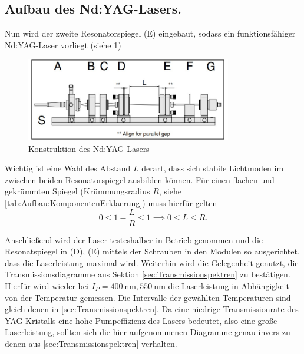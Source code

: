 \documentclass[../main.tex]{subfiles}
\begin{document}
    \subsection{Aufbau des Nd:YAG-Lasers.}\label{sec:Aufbau:NdYAGLaser}
        Nun wird der zweite Resonatorspiegel (E) eingebaut, sodass ein funktionsfähiger Nd:YAG-Laser vorliegt (siehe \ref{fig:AufbauTeil4})

        \begin{figure}[H]
            \centering
            \includegraphics[width=0.8\textwidth]{Bilddateien/Versuchsaufbau/Teil4.jpg}
            \caption{Konstruktion des Nd:YAG-Lasers \cite[p.31]{doc:experiment08}}
            \label{fig:AufbauTeil4}
        \end{figure}    

        Wichtig ist eine Wahl des Abstand $L$ derart, dass sich stabile Lichtmoden im zwischen beiden Resonatorspiegel ausbilden können. Für einen flachen und gekrümmten Spiegel (Krümmungsradius $R$, siehe \ref{tab:Aufbau:KomponentenErklaerung}) muss hierfür gelten \cite[p.11]{doc:experiment08}
        \[
            0\le 1 - \frac{L}{R}\le 1\implies 0\le L\le R.    
        \]

        Anschließend wird der Laser testeshalber in Betrieb genommen und die Resonatspiegel in (D), (E) mittels der Schrauben in den Modulen so ausgerichtet, dass die Laserleistung maximal wird. Weiterhin wird die Gelegenheit genutzt, die Transmissionsdiagramme aus Sektion \ref{sec:Transmissionspektren} zu bestätigen. Hierfür wird wieder bei $I_P = \SI{400}{\nano\m}, \SI{550}{\nano\m}$ die Laserleistung in Abhängigkeit von der Temperatur gemessen. Die Intervalle der gewählten Temperaturen sind gleich denen in \ref{sec:Transmissionspektren}. Da eine niedrige Transmissionrate des YAG-Kristalls eine hohe Pumpeffizienz des Lasers bedeutet, also eine große Laserleistung, sollten sich die hier aufgenommenen Diagramme genau invers zu denen aus \ref{sec:Transmissionspektren} verhalten.
\end{document}
